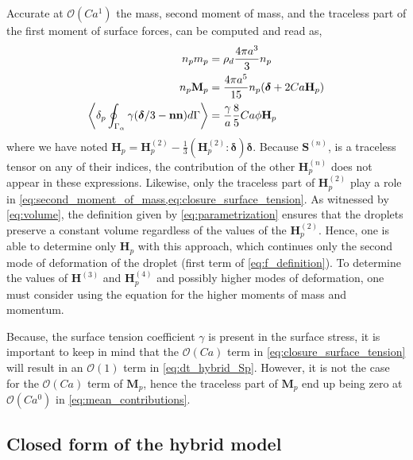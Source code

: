 Accurate at $\mathcal{O}(Ca^1)$ the mass, second moment of mass, and the traceless part of the first moment of surface forces, can be computed and read as,
\begin{align}
    n_p m_p &= \rho_d \frac{4\pi a^3}{3}n_p  
    \label{eq:volume}
    \\ 
    \label{eq:second_moment_of_mass}
    n_p \textbf{M}_p &= \frac{4\pi a^5}{15}n_p(\bm\delta+2Ca \textbf{H}_p) \\
    \pSavg{\gamma (\bm\delta/3 - \textbf{nn})} &=\frac{\gamma}{a}\frac{8}{5} Ca \phi \textbf{H}_p
    \label{eq:closure_surface_tension}
\end{align}
where we have noted $\textbf{H}_p = \textbf{H}_p^{(2)}-\frac{1}{3}(\textbf{H}_p^{(2)}: \bm\delta)\bm\delta$.   
Because $\textbf{S}^{(n)}$, is a traceless tensor on any of their indices, the contribution of the other $\textbf{H}_p^{(n)}$ does not appear in these expressions. 
Likewise, only the traceless part of $\textbf{H}_p^{(2)}$ play a role in \ref{eq:second_moment_of_mass,eq:closure_surface_tension}. 
As witnessed by \ref{eq:volume}, the definition given by \ref{eq:parametrization} ensures that the droplets preserve a constant volume regardless of the values of the $\textbf{H}_p^{(2)}$. 
Hence, one is able to determine only $\textbf{H}_p$ with this approach, which continues only the second mode of deformation  of the droplet (first term of \ref{eq:f_definition}).
To determine the values of $\textbf{H}^{(3)}$ and $\textbf{H}_p^{(4)}$ and possibly higher modes of deformation, one must consider using the equation for the higher moments of mass and momentum.


Because, the surface tension coefficient $\gamma$ is present in the surface stress, it is important to keep in mind that the $\mathcal{O}(Ca)$ term in \ref{eq:closure_surface_tension} will result in an $\mathcal{O}(1)$ term in \ref{eq:dt_hybrid_Sp}. 
However, it is not the case for the $\mathcal{O}(Ca)$ term of $\textbf{M}_p$, hence the traceless part of $\textbf{M}_p$ end up being zero at $\mathcal{O}(Ca^0)$ in \ref{eq:mean_contributions}.  


\subsection{Closed form of the hybrid model}

